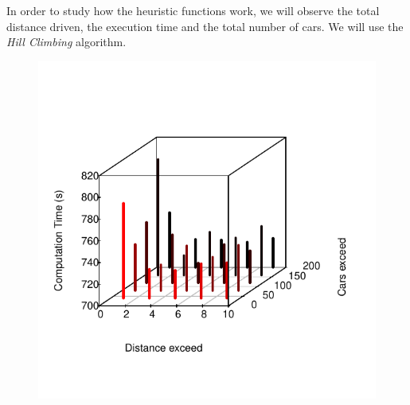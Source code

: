 \documentclass[12]{article}
\begin{document}
In order to study how the heuristic functions work, we will observe the total distance driven, the execution time and the total number of cars. We will use the \textit{Hill Climbing} algorithm.




\begin{figure}[H]
  \captionsetup{justification=centering}
   \centering
    \includegraphics[scale=0.8]{Results/data_5_1.pdf}
      \caption{}
      \label{fig:data_5_1}
  \end{figure}
    \vspace{1cm}
\end{document}
